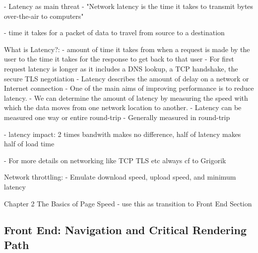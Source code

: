 - Latency as main threat
- "Network latency is the time it takes to transmit bytes over-the-air to computers"


- time it takes for a packet of data to travel from source to a destination

What is Latency?:
- amount of time it takes from when a request is made by the user to the time it takes for the response to get back to that user
- For first request latency is longer as it includes a DNS lookup, a TCP handshake, the secure TLS negotiation
- Latency describes the amount of delay on a network or Internet connection
- One of the main aims of improving performance is to reduce latency.
- We can determine the amount of latency by measuring the speed with which the data moves from one network location to another.
- Latency can be measured one way or entire round-trip
- Generally measured in round-trip



- latency impact: 2 times bandwith makes no difference, half of latency makes half of load time

- For more details on networking like TCP TLS etc always cf to Grigorik

Network throttling:
- Emulate download speed, upload speed, and minimum latency

Chapter 2 The Basics of Page Speed
- use this as transition to Front End Section









\subsection{Front End: Navigation and Critical Rendering Path}

